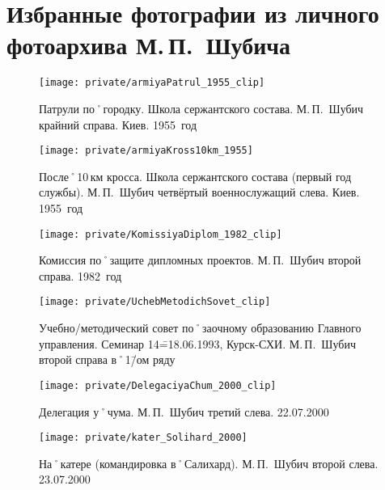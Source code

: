 ﻿\section[Фотографии из фотоархива М.\,П.~Шубича]{Избранные фотографии из личного фотоархива М.\,П.~Шубича}

\makeatletter
\setlength{\@fptop}{0pt}
\makeatother

\begin{figure}[H]
\texttt{[image: private/armiyaPatrul\_1955\_clip]}
\caption{Патрули по˚городку. Школа сержантского состава. М.\,П.~Шубич крайний справа. Киев. 1955~год}
\label{fig:armiyaPatrul_1955}
\end{figure}

\begin{figure}[h]
\texttt{[image: private/armiyaKross10km\_1955]}
\caption{После˚10\,км кросса. Школа сержантского состава (первый год службы). М.\,П.~Шубич четвёртый военнослужащий слева. Киев. 1955~год}
\label{fig:armiyaKross10km_1955}
\end{figure}

\begin{figure}[h]
\texttt{[image: private/KomissiyaDiplom\_1982\_clip]}
\caption{Комиссия по˚защите дипломных проектов. М.\,П.~Шубич второй справа. 1982~год}
\label{fig:KomissiyaDiplom_1982}
\end{figure}

\begin{figure}[h]
\texttt{[image: private/UchebMetodichSovet\_clip]}
\caption{Учебно\-/методический совет по˚заочному образованию Главного управления. Семинар 14\==18.06.1993, Курск-СХИ. М.\,П.~Шубич второй справа в˚1\=/ом ряду}
\label{fig:UchebMetodichSovet}
\end{figure}

\begin{figure}[h]
\texttt{[image: private/DelegaciyaChum\_2000\_clip]}
\caption{Делегация у˚чума. М.\,П.~Шубич третий слева. 22.07.2000}
\label{fig:DelegaciyaChum_2000}
\end{figure}

\begin{figure}[h]
\texttt{[image: private/kater\_Solihard\_2000]}
\caption{На˚катере (командировка в˚Салихард). М.\,П.~Шубич второй слева. 23.07.2000}
\label{fig:kater_Solihard_2000}
\end{figure}

